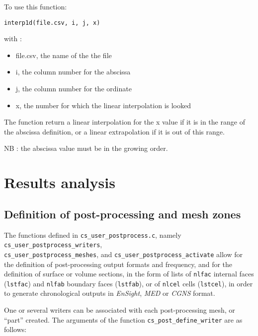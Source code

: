 {{{To use this function:

\texttt{interp1d(file.csv, i, j, x)}

with :
\begin{itemize}
\item file.csv, the name of the the file
\item i, the column number for the abscissa
\item j, the column number for the ordinate
\item x, the number for which the linear interpolation is looked
\end{itemize}
The function return a linear interpolation for the x value
if it is in the range of the abscissa definition, or a
linear extrapolation if it is out of this range.

NB : the abscissa value must be in the growing order.

\section{Results analysis}

\subsection{Definition of post-processing and mesh zones}
\label{sec:prg_definitionpostprocess}
The functions defined in \texttt{cs\_user\_postprocess.c}, namely
\texttt{cs\_user\_postprocess\_writers}, \\ \texttt{cs\_user\_postprocess\_meshes},
and \texttt{cs\_user\_postprocess\_activate} allow for
the definition of post-processing output formats and frequency, and
for the definition of  surface or volume sections, in the form
of lists of \texttt{nlfac} internal faces (\texttt{lstfac}) and
\texttt{nlfab} boundary faces (\texttt{lstfab}),
or of \texttt{nlcel} cells (\texttt{lstcel}), in order to generate
chronological outputs in {\em EnSight}, {\em MED} or {\em CGNS} format.

One or several writers can be associated with each post-processing
mesh, or ``part'' created. The arguments of the function
\texttt{cs\_post\_define\_writer} are as follows:

}}}
